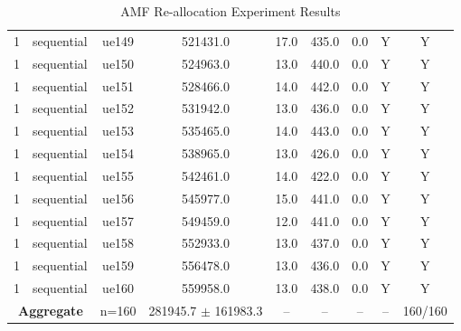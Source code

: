 \begin{table}[ht]
\begin{tabular}{|c|c|c|c|c|c|c|c|c|}
1 & sequential & ue149 & 521431.0 & 17.0 & 435.0 & 0.0 & Y & Y \\
1 & sequential & ue150 & 524963.0 & 13.0 & 440.0 & 0.0 & Y & Y \\
1 & sequential & ue151 & 528466.0 & 14.0 & 442.0 & 0.0 & Y & Y \\
1 & sequential & ue152 & 531942.0 & 13.0 & 436.0 & 0.0 & Y & Y \\
1 & sequential & ue153 & 535465.0 & 14.0 & 443.0 & 0.0 & Y & Y \\
1 & sequential & ue154 & 538965.0 & 13.0 & 426.0 & 0.0 & Y & Y \\
1 & sequential & ue155 & 542461.0 & 14.0 & 422.0 & 0.0 & Y & Y \\
1 & sequential & ue156 & 545977.0 & 15.0 & 441.0 & 0.0 & Y & Y \\
1 & sequential & ue157 & 549459.0 & 12.0 & 441.0 & 0.0 & Y & Y \\
1 & sequential & ue158 & 552933.0 & 13.0 & 437.0 & 0.0 & Y & Y \\
1 & sequential & ue159 & 556478.0 & 13.0 & 436.0 & 0.0 & Y & Y \\
1 & sequential & ue160 & 559958.0 & 13.0 & 438.0 & 0.0 & Y & Y \\
\multicolumn{2}{|c|}{\textbf{Aggregate}} & n=160 & 281945.7 $\pm$ 161983.3 & -- & -- & -- & -- & 160/160 \\
\hline
\end{tabular}
\caption{AMF Re-allocation Experiment Results}
\label{tab:amf_realloc}
\end{table}
